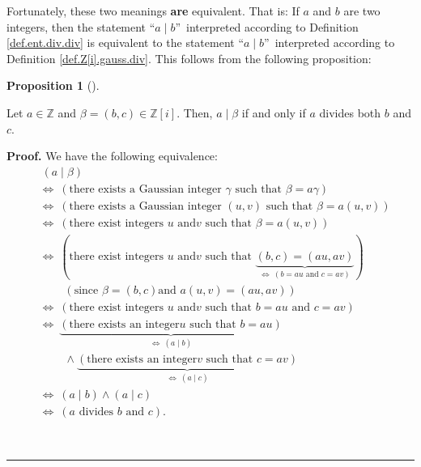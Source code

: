 \documentclass[numbers=enddot,12pt,final,onecolumn,notitlepage]{scrartcl}%
\numberwithin{exer}{subsection}
\theoremstyle{definition}
\newtheorem{prop}[theo]{Proposition}
\newenvironment{proposition}[1][]
{\begin{prop}[#1]\begin{leftbar}}
{\end{leftbar}\end{prop}}
\newenvironment{proof}[1][Proof]{\noindent\textbf{#1.} }{\ \rule{0.5em}{0.5em}}
\begin{document}
Fortunately, these two meanings \textbf{are} equivalent. That is: If $a$ and
$b$ are two integers, then the statement \textquotedblleft$a\mid
b$\textquotedblright\ interpreted according to Definition
\ref{def.ent.div.div} is equivalent to the statement \textquotedblleft$a\mid
b$\textquotedblright\ interpreted according to Definition
\ref{def.Z[i].gauss.div}. This follows from the following proposition:

\begin{proposition}
\label{prop.Z[i].gauss.div.int|gauss}Let $a\in\mathbb{Z}$ and $\beta=\left(
b,c\right)  \in\mathbb{Z}\left[  i\right]  $. Then, $a\mid\beta$ if and only
if $a$ divides both $b$ and $c$.
\end{proposition}

\begin{proof}
We have the following equivalence:%
\begin{align*}
&  \ \left(  a\mid\beta\right) \\
&  \Longleftrightarrow\ \left(  \text{there exists a Gaussian integer }%
\gamma\text{ such that }\beta=a\gamma\right) \\
&  \Longleftrightarrow\ \left(  \text{there exists a Gaussian integer }\left(
u,v\right)  \text{ such that }\beta=a\left(  u,v\right)  \right) \\
&  \Longleftrightarrow\ \left(  \text{there exist integers }u\text{ and
}v\text{ such that }\beta=a\left(  u,v\right)  \right) \\
&  \Longleftrightarrow\ \left(  \text{there exist integers }u\text{ and
}v\text{ such that }\underbrace{\left(  b,c\right)  =\left(  au,av\right)
}_{\Longleftrightarrow\ \left(  b=au\text{ and }c=av\right)  }\right) \\
&  \ \ \ \ \ \ \ \ \ \ \left(  \text{since }\beta=\left(  b,c\right)  \text{
and }a\left(  u,v\right)  =\left(  au,av\right)  \right) \\
&  \Longleftrightarrow\ \left(  \text{there exist integers }u\text{ and
}v\text{ such that }b=au\text{ and }c=av\right) \\
&  \Longleftrightarrow\ \underbrace{\left(  \text{there exists an integer
}u\text{ such that }b=au\right)  }_{\Longleftrightarrow\ \left(  a\mid
b\right)  }\\
&  \ \ \ \ \ \ \ \ \ \ \wedge\underbrace{\left(  \text{there exists an integer
}v\text{ such that }c=av\right)  }_{\Longleftrightarrow\ \left(  a\mid
c\right)  }\\
&  \Longleftrightarrow\ \left(  a\mid b\right)  \wedge\left(  a\mid c\right)
\\
&  \Longleftrightarrow\ \left(  a\text{ divides }b\text{ and }c\right)  .
\end{align*}

\end{proof}
\end{document}
